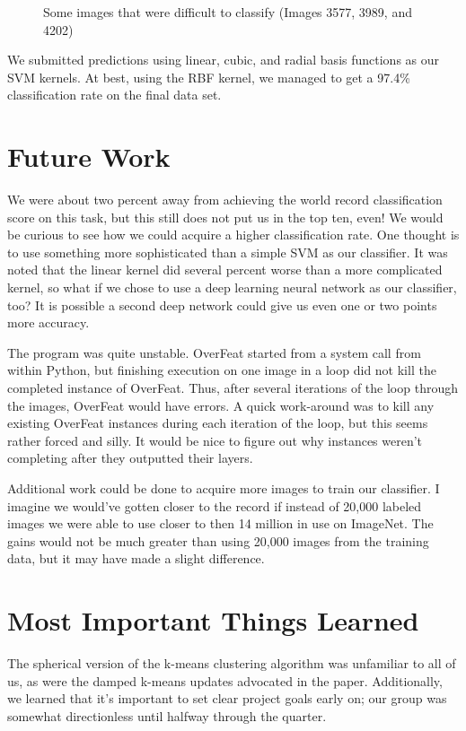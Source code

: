 \documentclass[12pt]{article}
\begin{document}
\begin{figure}[H]
\caption{Some images that were difficult to classify (Images 3577, 3989, and 4202)}
\end{figure}

We submitted predictions using linear, cubic, and radial basis functions as our SVM kernels. At best, using the RBF kernel, we managed to get a 97.4\% classification rate on the final data set.

\section{Future Work}
We were about two percent away from achieving the world record classification score on this task, but this still does not put us in the top ten, even! We would be curious to see how we could acquire a higher classification rate. One thought is to use something more sophisticated than a simple SVM as our classifier. It was noted that the linear kernel did several percent worse than a more complicated kernel, so what if we chose to use a deep learning neural network as our classifier, too? It is possible a second deep network could give us even one or two points more accuracy.

The program was quite unstable. OverFeat started from a system call from within Python, but finishing execution on one image in a loop did not kill the completed instance of OverFeat. Thus, after several iterations of the loop through the images, OverFeat would have errors. A quick work-around was to kill any existing OverFeat instances during each iteration of the loop, but this seems rather forced and silly. It would be nice to figure out why instances weren't completing after they outputted their layers. 

Additional work could be done to acquire more images to train our classifier. I imagine we would've gotten closer to the record if instead of 20,000 labeled images we were able to use closer to then 14 million in use on ImageNet. The gains would not be much greater than using 20,000 images from the training data, but it may have made a slight difference.

\section{Most Important Things Learned}
The spherical version of the k-means clustering algorithm was unfamiliar to all of us, as were the damped k-means updates advocated in the paper. Additionally, we learned that it's important to set clear project goals early on; our group was somewhat directionless until halfway through the quarter.
 
\end{document}
